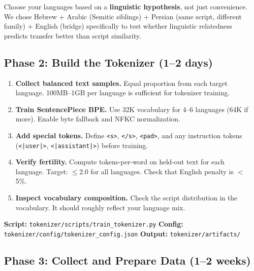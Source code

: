 \documentclass[11pt,a4paper]{article}
\begin{document}
\begin{tip}
Choose your languages based on a \textbf{linguistic hypothesis}, not just convenience. We chose Hebrew + Arabic (Semitic siblings) + Persian (same script, different family) + English (bridge) specifically to test whether linguistic relatedness predicts transfer better than script similarity.
\end{tip}

\subsection{Phase 2: Build the Tokenizer (1--2 days)}

\begin{enumerate}
    \item \textbf{Collect balanced text samples.} Equal proportion from each target language. 100MB--1GB per language is sufficient for tokenizer training.
    
    \item \textbf{Train SentencePiece BPE.} Use 32K vocabulary for 4--6 languages (64K if more). Enable byte fallback and NFKC normalization.
    
    \item \textbf{Add special tokens.} Define \texttt{<s>}, \texttt{</s>}, \texttt{<pad>}, and any instruction tokens (\texttt{<|user|>}, \texttt{<|assistant|>}) before training.
    
    \item \textbf{Verify fertility.} Compute tokens-per-word on held-out text for each language. Target: $\leq$2.0 for all languages. Check that English penalty is $<$5\%.
    
    \item \textbf{Inspect vocabulary composition.} Check the script distribution in the vocabulary. It should roughly reflect your language mix.
\end{enumerate}

\begin{reporef}
\textbf{Script:} \texttt{tokenizer/scripts/train\_tokenizer.py}\hfill
\textbf{Config:} \texttt{tokenizer/config/tokenizer\_config.json}\hfill
\textbf{Output:} \texttt{tokenizer/artifacts/}
\end{reporef}

\subsection{Phase 3: Collect and Prepare Data (1--2 weeks)}
\end{document}

